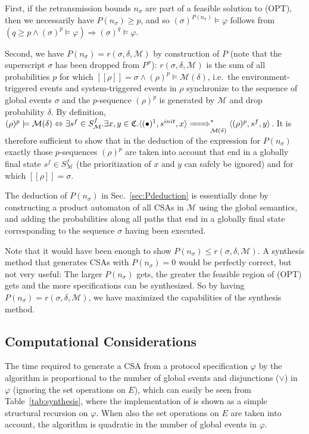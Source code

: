 \documentclass{sig-alternate}
\renewcommand{\v}{\varphi}
\renewcommand{\d}{\delta}
\newcommand{\M}{\mathcal{M}}
\newcommand{\SAP}{\mathfrak{C}}
\newcommand{\generated}{\models {\M(\d)}}
\newcommand{\proj}[1]{[\![{#1}]\!]}
\renewcommand{\sec}[1]{Sec.\ \ref{sec:#1}}
\newcommand{\tab}[1]{Table~\ref{tab:#1}}
\begin{document}
First, if the retransmission bounds $n_{\sigma}$ are part of a feasible solution to (OPT), then we necessarily have $P(n_{\sigma}) \geq p$, and so $(\sigma)^{P(n_{\sigma})} \models \v$ follows from $(q \geq p \wedge (\sigma)^{p} \models \v) \Rightarrow (\sigma)^{q} \models \v$.

Second, we have $P(n_\sigma) = r(\sigma, \d, \M)$ by construction of $P$ (note that the superscript $\sigma$ has been dropped from $P^{\sigma}$): $r(\sigma, \d, \M)$ is the sum of all probabilities $p$ for which $\proj{\rho} = \sigma \wedge (\rho)^p \generated$, i.e.\ the environment-triggered events and system-triggered events in $\rho$ synchronize to the sequence of global events $\sigma$ and the $p$-sequence $(\rho)^p$ is generated by $\M$ and drop probability $\d$. By definition, $(\rho)^p \generated \Leftrightarrow \exists s^f \in S^f_{\M} . \exists x, y \in \SAP . \langle (\bullet)^1, s^{init}, x \rangle \bigstep{}^* \langle (\rho)^p, s^f, y \rangle$. It is therefore sufficient to show that in the deduction of the expression for $P(n_{\sigma})$ exactly those $p$-sequences $(\rho)^p$ are taken into account that end in a globally final state $s^f \in S^f_{\M}$ (the prioritization of $x$ and $y$ can safely be ignored) and for which $\proj{\rho} = \sigma$.

The deduction of $P(n_{\sigma})$ in \sec{Pdeduction} is essentially done by constructing a product automaton of all CSAs in $\M$ using the global semantics, and adding the probabilities along all paths that end in a globally final state corresponding to the sequence $\sigma$ having been executed.

Note that it would have been enough to show $P(n_\sigma) \leq r(\sigma, \d, \M)$. A synthesis method that generates CSAs with $P(n_\sigma) = 0$ would be perfectly correct, but not very useful: The larger $P(n_\sigma)$ gets, the greater the feasible region of (OPT) gets and the more specifications can be synthesized. So by having $P(n_\sigma) = r(\sigma, \d, \M)$, we have maximized the capabilities of the synthesis method.


\subsection{Computational Considerations} \label{sec:computation}

The time required to generate a CSA from a protocol specification $\v$ by the {} algorithm is proportional to the number of global events and disjunctions ($\vee$) in $\v$ (ignoring the set operations on $E$), which can easily be seen from \tab{synthesis}, where the implementation of {} is shown as a simple structural recursion on $\v$. When also the set operations on $E$ are taken into account, the algorithm is quadratic in the number of global events in $\v$.
\end{document}
